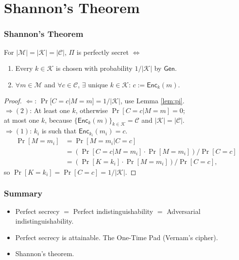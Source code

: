 \section{Shannon's Theorem}
\begin{frame}\frametitle{Shannon's Theorem}
\begin{theorem}
For $|\mathcal{M}| = |\mathcal{K}| = |\mathcal{C}|$, $\Pi$ is perfectly secret $\iff$
\begin{enumerate}
\item Every $k \in \mathcal{K}$ is chosen with probability $1/|\mathcal{K}|$ by $\mathsf{Gen}$.
\item $\forall m \in \mathcal{M}$ and $\forall c \in \mathcal{C}$, $\exists$ unique $k \in \mathcal{K}$: $c := \mathsf{Enc}_k(m)$.
\end{enumerate}
\end{theorem}
\begin{proof}
$\Leftarrow$: $\Pr[C=c|M=m]=1/|\mathcal{K}|$, use Lemma \ref{lem:pi}. \\
$\Rightarrow (2)$: At least one $k$, otherwise $\Pr[C=c|M=m]=0$; \\
at most one $k$, because $\{\mathsf{Enc}_k(m)\}_{k\in \mathcal{K}} = \mathcal{C}$ and $|\mathcal{K}| = |\mathcal{C}|$.\\
$\Rightarrow (1)$: $k_i$ is such that $\mathsf{Enc}_{k_i}(m_i)=c$.
\[ \begin{split}
\Pr[M = m_i] &= \Pr[M=m_i|C=c] \\
             &= \left( \Pr[C =c|M=m_i] \cdot \Pr[M = m_i] \right) / \Pr[C=c] \\
 &= \left( \Pr[K=k_i] \cdot \Pr[M = m_i] \right) / \Pr[C=c],
\end{split}
\]
so $\Pr[K=k_i] = \Pr[C = c] = 1/|\mathcal{K}|$.
\end{proof}
\end{frame}
\begin{frame}\frametitle{Summary}
\begin{itemize}
\item Perfect secrecy $=$ Perfect indistinguishability $=$ Adversarial indistinguishability.
\item Perfect secrecy is attainable. The One-Time Pad (Vernam's cipher).
\item Shannon's theorem.
\end{itemize}	
\end{frame}

